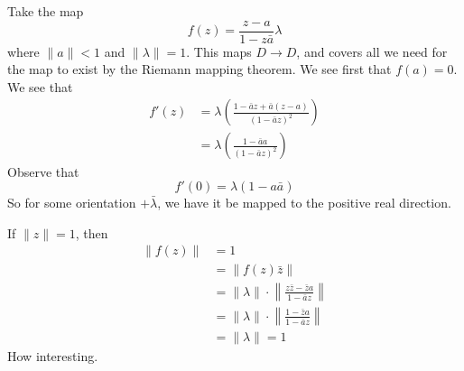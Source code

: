 Take the map
\begin{equation}
f(z)=\frac{z-a}{1-z\bar{a}}\lambda
\end{equation}
where $\|a\|<1$ and $\|\lambda\|=1$. This maps $D\to D$, and
covers all we need for the map to exist by the Riemann mapping
theorem. We see first that $f(a)=0$. We see that
\begin{subequations}
\begin{align}
f'(z) &= \lambda\left(\frac{1-\bar{a}{z}+\bar{a}(z-a)}{(1-\bar{a}z)^{2}}
\right)\\
&=\lambda\left(\frac{1-\bar{a}a}{(1-\bar{a}z)^{2}}\right)
\end{align}
\end{subequations}
Observe that
\begin{equation}
f'(0)=\lambda(1-a\bar{a})
\end{equation}
So for some orientation $+\bar{\lambda}$, we have it be mapped to
the positive real direction.

If $\|z\|=1$, then 
\begin{subequations}
\begin{align}
\|f(z)\|&=1\\
&=\|f(z)\bar{z}\|\\
&=\|\lambda\|\cdot\left\|\frac{z\bar{z}-\bar{z}a}{1-\bar{a}z}\right\|\\
&=\|\lambda\|\cdot\left\|\frac{1-\bar{z}a}{1-\bar{a}z}\right\|\\
&=\|\lambda\|=1
\end{align}
\end{subequations}
How interesting.
